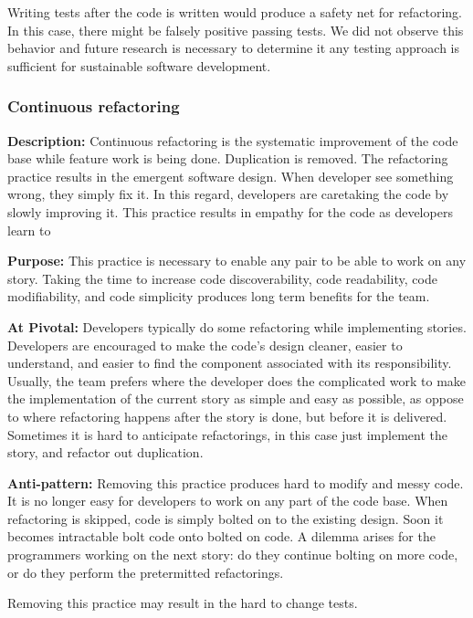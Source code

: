 \begin{table}[]
Writing tests after the code is written would produce a safety net for refactoring. In this case, there might be falsely positive passing tests. We did not observe this behavior and future research is necessary to determine it any testing approach is sufficient for sustainable software development.

\subsubsection{Continuous refactoring}
\textbf{Description:} Continuous refactoring is the systematic improvement of the code base while feature work is being done. Duplication is removed. The refactoring practice results in the emergent software design. When developer see something wrong, they simply fix it. In this regard, developers are caretaking the code by slowly improving it. This practice results in empathy for the code as developers learn to 

\textbf{Purpose:} This practice is necessary to enable any pair to be able to work on any story. Taking the time to increase code discoverability, code readability, code modifiability, and code simplicity produces long term benefits for the team. 

\textbf{At Pivotal:} Developers typically do some refactoring while implementing stories. Developers are encouraged to make the code's design cleaner, easier to understand, and easier to find the component associated with its responsibility. Usually, the team prefers  where the developer does the complicated work to make the implementation of the current story as simple and easy as possible, as oppose to  where refactoring happens after the story is done, but before it is delivered.  Sometimes it is hard to anticipate refactorings, in this case just implement the story, and refactor out duplication. 

\textbf{Anti-pattern:}  Removing this practice produces hard to modify and messy code. It is no longer easy for developers to work on any part of the code base. When refactoring is skipped, code is simply bolted on to the existing design. Soon it becomes intractable bolt code onto bolted on code. A dilemma arises for the programmers working on the next story: do they continue bolting on more code, or do they perform the pretermitted refactorings.

Removing this practice may result in the hard to change tests.


\end{table}
